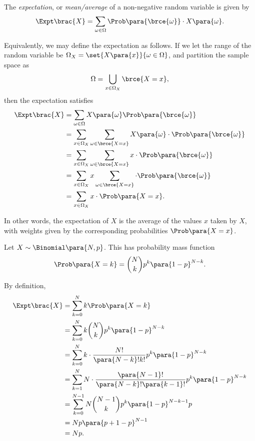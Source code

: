 \begin{definition}
    \label{def:expectation-non-negative}%
    The \emph{expectation}, or \emph{mean/average} of a non-negative random variable is given by
    \[
        \Expt \brac{X} = \sum_{\omega \in \Omega} \Prob\para{\brce{\omega}} \cdot X\para{\omega}.
    \]
\end{definition}

Equivalently, we may define the expectation as follows. If we let the range of the random variable be \(\Omega_X = \set{X\para{x}}{\omega \in \Omega}\), and partition the sample space as
\[
    \Omega = \bigcup_{x \in \Omega_X} \brce{X = x},
\]
then the expectation satisfies
\begin{align*}
    \Expt\brac{X} &= \sum_{\omega \in \Omega} X\para{\omega} \Prob\para{\brce{\omega}} \\
    &= \sum_{x \in \Omega_X} \sum_{\omega \in \brce{X = x}} X\para{\omega} \cdot \Prob\para{\brce{\omega}} \\
    &= \sum_{x \in \Omega_X} \sum_{\omega \in \brce{X = x}} x \cdot \Prob\para{\brce{\omega}} \\
    &= \sum_{x \in \Omega_X} x \sum_{\omega \in \brce{X = x}} \cdot \Prob\para{\brce{\omega}} \\
    &= \sum_{x \in \Omega_X} x \cdot \Prob\para{X = x}.
\end{align*}

In other words, the expectation of \(X\) is the average of the values \(x\) taken by \(X\), with weights given by the corresponding probabilities \(\Prob\para{X = x}\).

\begin{example}
    \label{ex:expectation-binomial}%
    Let \(X \sim \Binomial\para{N, p}\). This has probability mass function
    \[
        \Prob\para{X = k} = \binom{N}{k} p^k \para{1 - p}^{N - k}.
    \]

    By definition,
    \begin{align*}
        \Expt\brac{X} &= \sum_{k = 0}^{N} k \Prob\para{X = k} \\
        &= \sum_{k = 0}^{N} k \binom{N}{k} p^k \para{1 - p}^{N - k} \\
        &= \sum_{k = 0}^{N} k \cdot \frac{N!}{\para{N - k}! k!} p^k \para{1 - p}^{N - k} \\
        &= \sum_{k = 1}^{N} N \cdot \frac{\para{N - 1}!}{\para{N - k}! \para{k - 1}!} p^k \para{1 - p}^{N - k} \\
        &= \sum_{k = 0}^{N - 1} N \binom{N - 1}{k} p^{k} \para{1 - p}^{N - k - 1} p \\
        &= Np \para{p + 1 - p}^{N - 1} \\
        &= Np.
    \end{align*}
\end{example}

